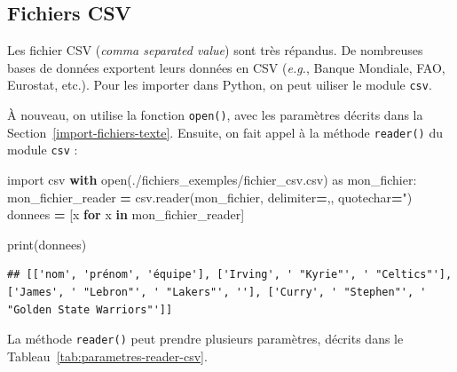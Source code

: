 \documentclass[
  12pt,
]{book}
\newenvironment{Shaded}{\begin{snugshade}}{\end{snugshade}}
\newcommand{\BuiltInTok}[1]{#1}
\newcommand{\ControlFlowTok}[1]{\textcolor[rgb]{0.13,0.29,0.53}{\textbf{#1}}}
\newcommand{\ImportTok}[1]{#1}
\newcommand{\KeywordTok}[1]{\textcolor[rgb]{0.13,0.29,0.53}{\textbf{#1}}}
\newcommand{\NormalTok}[1]{#1}
\newcommand{\OperatorTok}[1]{\textcolor[rgb]{0.81,0.36,0.00}{\textbf{#1}}}
\newcommand{\StringTok}[1]{\textcolor[rgb]{0.31,0.60,0.02}{#1}}
\numberwithin{equation}{section}
\numberwithin{countremarque}{section}
\begin{document}
\subsection{Fichiers CSV}\label{importation-fichiers-csv}

Les fichier CSV (\emph{comma separated value}) sont très répandus. De nombreuses bases de données exportent leurs données en CSV (\emph{e.g.}, Banque Mondiale, FAO, Eurostat, etc.). Pour les importer dans Python, on peut uiliser le module \texttt{csv}.

À nouveau, on utilise la fonction \texttt{open()}, avec les paramètres décrits dans la Section~\ref{import-fichiers-texte}. Ensuite, on fait appel à la méthode \texttt{reader()} du module \texttt{csv} :

\begin{Shaded}
\begin{Highlighting}[]
\ImportTok{import}\NormalTok{ csv}
\ControlFlowTok{with} \BuiltInTok{open}\NormalTok{(}\StringTok{\textquotesingle{}./fichiers\_exemples/fichier\_csv.csv\textquotesingle{}}\NormalTok{) }\ImportTok{as}\NormalTok{ mon\_fichier:}
\NormalTok{  mon\_fichier\_reader }\OperatorTok{=}\NormalTok{ csv.reader(mon\_fichier, delimiter}\OperatorTok{=}\StringTok{\textquotesingle{},\textquotesingle{}}\NormalTok{, quotechar}\OperatorTok{=}\StringTok{\textquotesingle{}"\textquotesingle{}}\NormalTok{)}
\NormalTok{  donnees }\OperatorTok{=}\NormalTok{ [x }\ControlFlowTok{for}\NormalTok{ x }\KeywordTok{in}\NormalTok{ mon\_fichier\_reader]}

\BuiltInTok{print}\NormalTok{(donnees)}
\end{Highlighting}
\end{Shaded}

\begin{lstlisting}
## [['nom', 'prénom', 'équipe'], ['Irving', ' "Kyrie"', ' "Celtics"'], ['James', ' "Lebron"', ' "Lakers"', ''], ['Curry', ' "Stephen"', ' "Golden State Warriors"']]
\end{lstlisting}

La méthode \texttt{reader()} peut prendre plusieurs paramètres, décrits dans le Tableau~\ref{tab:parametres-reader-csv}.
\end{document}
